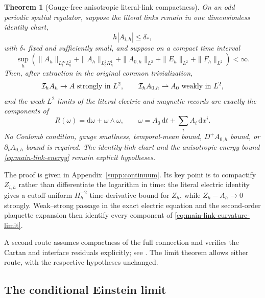 \documentclass[11pt]{article}
\newtheorem{theorem}{Theorem}[section]
\numberwithin{equation}{section}
\theoremstyle{definition}
\theoremstyle{remark}
\newcommand{\dd}{\mathrm d}
\begin{document}
\begin{theorem}[Gauge-free anisotropic literal-link compactness]
\label{thm:main-literal-link-compactness}
On an odd periodic spatial regulator, suppose the literal links remain in one
dimensionless identity chart,
\begin{equation}
 h|A_{i,h}|\le\delta_*,
 \label{eq:main-link-chart}
\end{equation}
with $\delta_*$ fixed and sufficiently small, and suppose on a compact time
interval
\begin{equation}
 \sup_h\left(
 \|A_h\|_{L^\infty_tL_h^2}+\|A_h\|_{L^2_tH_h^1}
 +\|A_{0,h}\|_{L^2}+\|E_h\|_{L^2}+\|F_h\|_{L^2}\right)<\infty.
 \label{eq:main-link-energy}
\end{equation}
Then, after extraction in the original common trivialization,
\begin{equation}
 \mathcal I_hA_h\to A\ \hbox{strongly in }L^2,
 \qquad
 \mathcal I_hA_{0,h}\rightharpoonup A_0\ \hbox{weakly in }L^2,
 \label{eq:main-link-convergence}
\end{equation}
and the weak $L^2$ limits of the literal electric and magnetic records are
exactly the components of
\begin{equation}
 R(\omega)=\dd\omega+\omega\wedge\omega,
 \qquad \omega=A_0\,\dd t+\sum_iA_i\,\dd x^i.
 \label{eq:main-link-curvature-limit}
\end{equation}
No Coulomb condition, gauge smallness, temporal-mean bound,
$D^+A_{0,h}$ bound, or $\partial_tA_{0,h}$ bound is required.  The
identity-link chart and the anisotropic energy bound
\eqref{eq:main-link-energy} remain explicit hypotheses.
\end{theorem}

The proof is given in Appendix~\ref{supp:continuum}.  Its key point is to
compactify $Z_{i,h}$ rather than differentiate the logarithm in time: the
literal electric identity gives a cutoff-uniform $H_h^{-2}$ time-derivative
bound for $Z_h$, while $Z_h-A_h\to0$ strongly.  Weak--strong passage in the
exact electric equation and the second-order plaquette expansion then
identify every component of \eqref{eq:main-link-curvature-limit}.


A second route assumes compactness of the full connection and verifies the
Cartan and interface residuals explicitly; see
.
The limit theorem allows either route, with the respective hypotheses
unchanged.
\subsection{The conditional Einstein limit}
\end{document}
